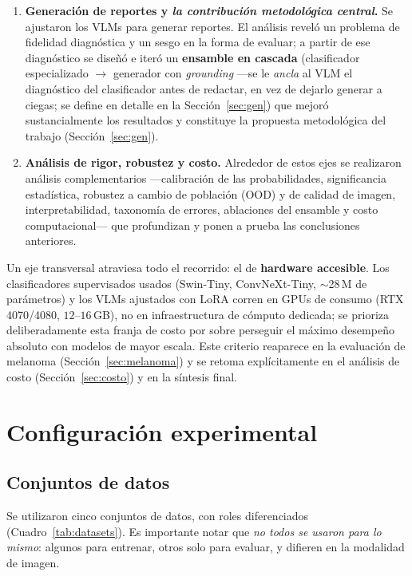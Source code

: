 \documentclass[11pt, a4paper]{article}
\begin{document}
\begin{enumerate}[leftmargin=1.6em]
  \item \textbf{Generación de reportes y \emph{la contribución metodológica central}.} Se ajustaron los
  VLMs para generar reportes. El análisis reveló un problema de fidelidad diagnóstica y un sesgo en la
  forma de evaluar; a partir de ese diagnóstico se diseñó e iteró un \textbf{ensamble en cascada}
  (clasificador especializado $\rightarrow$ generador con \emph{grounding} —se le \emph{ancla} al VLM el
  diagnóstico del clasificador antes de redactar, en vez de dejarlo generar a ciegas; se define en detalle
  en la Sección~\ref{sec:gen}) que mejoró sustancialmente los
  resultados y constituye la propuesta metodológica del trabajo (Sección~\ref{sec:gen}).
  \item \textbf{Análisis de rigor, robustez y costo.} Alrededor de estos ejes se realizaron análisis
  complementarios —calibración de las probabilidades, significancia estadística, robustez a cambio de
  población (OOD) y de calidad de imagen, interpretabilidad, taxonomía de errores, ablaciones del ensamble
  y costo computacional— que profundizan y ponen a prueba las conclusiones anteriores.
\end{enumerate}

Un eje transversal atraviesa todo el recorrido: el de \textbf{hardware accesible}. Los clasificadores
supervisados usados (Swin-Tiny, ConvNeXt-Tiny, $\sim$28\,M de parámetros) y los VLMs ajustados con LoRA
corren en GPUs de consumo (RTX 4070/4080, $12$--$16$\,GB), no en infraestructura de cómputo dedicada; se
prioriza deliberadamente esta franja de costo por sobre perseguir el máximo desempeño absoluto con modelos
de mayor escala. Este criterio reaparece en la evaluación de melanoma
(Sección~\ref{sec:melanoma}) y se retoma explícitamente en el análisis de costo
(Sección~\ref{sec:costo}) y en la síntesis final.


\section{Configuración experimental}
\label{sec:config}
\subsection{Conjuntos de datos}
\label{sec:datasets}
Se utilizaron cinco conjuntos de datos, con roles diferenciados (Cuadro~\ref{tab:datasets}). Es
importante notar que \emph{no todos se usaron para lo mismo}: algunos para entrenar, otros solo para
evaluar, y difieren en la modalidad de imagen.
\end{document}
